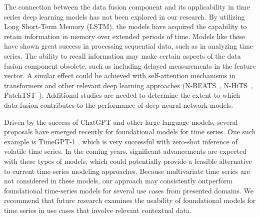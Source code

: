 The connection between the data fusion component and its applicability in time series deep learning models has not been explored in our research.
By utilizing Long Short-Term Memory (LSTM), the models have acquired the capability to retain information in memory over extended periods of time.
Models like these have shown great success in processing sequential data, such as in analyzing time series.
The ability to recall information may make certain aspects of the data fusion component obsolete, such as including delayed measurements in the feature vector.
A similar effect could be achieved with self-attention mechanisms in transformers and other relevant deep learning approaches (N-BEATS~\cite{oreshkin:2019:nbeats}, N-HiTS~\cite{challu:2023:nhits}, PatchTST~\cite{nie:2022:time}).
Additional studies are needed to determine the extent to which data fusion contributes to the performance of deep neural network models.

Driven by the success of ChatGPT and other large language models, several proposals have emerged recently for foundational models for time series.
One such example is TimeGPT-1 \cite{garza:2023:timegpt}, which is very successful with zero-shot inference of volatile time series.
In the coming years, significant advancements are expected with these types of models, which could potentially provide a feasible alternative to current time-series modeling approaches.
Because multivariate time series are not considered in these models, our approach may consistently outperform foundational time-series models for several use cases from presented domains.
We recommend that future research examines the usability of foundational models for time series in use cases that involve relevant contextual data.


